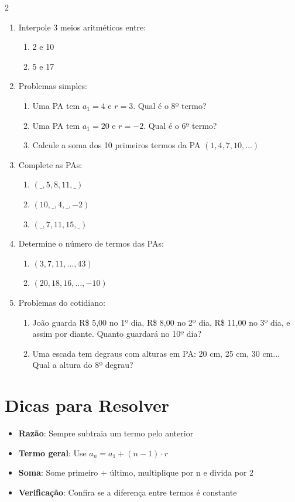 \documentclass[11pt]{article}
\begin{document}
\begin{multicols}{2}
\begin{enumerate}[leftmargin=*]
\item Interpole 3 meios aritméticos entre:
\begin{enumerate}[label=\alph*)]
\item 2 e 10
\item 5 e 17
\end{enumerate}

\item Problemas simples:
\begin{enumerate}[label=\alph*)]
\item Uma PA tem $a_1 = 4$ e $r = 3$. Qual é o 8º termo?
\item Uma PA tem $a_1 = 20$ e $r = -2$. Qual é o 6º termo?
\item Calcule a soma dos 10 primeiros termos da PA $(1, 4, 7, 10, \ldots)$
\end{enumerate}

\item Complete as PAs:
\begin{enumerate}[label=\alph*)]
\item $( \_, 5, 8, 11, \_ )$
\item $(10, \_, 4, \_, -2)$
\item $( \_, 7, 11, 15, \_ )$
\end{enumerate}

\item Determine o número de termos das PAs:
\begin{enumerate}[label=\alph*)]
\item $(3, 7, 11, \ldots, 43)$
\item $(20, 18, 16, \ldots, -10)$
\end{enumerate}

\item Problemas do cotidiano:
\begin{enumerate}[label=\alph*)]
\item João guarda R\$ 5,00 no 1º dia, R\$ 8,00 no 2º dia, R\$ 11,00 no 3º dia, e assim por diante. Quanto guardará no 10º dia?
\item Uma escada tem degraus com alturas em PA: 20 cm, 25 cm, 30 cm... Qual a altura do 8º degrau?
\end{enumerate}

\end{enumerate}

\section*{Dicas para Resolver}

\begin{itemize}
\item \textbf{Razão}: Sempre subtraia um termo pelo anterior
\item \textbf{Termo geral}: Use $a_n = a_1 + (n-1) \cdot r$
\item \textbf{Soma}: Some primeiro + último, multiplique por n e divida por 2
\item \textbf{Verificação}: Confira se a diferença entre termos é constante
\end{itemize}

\end{multicols}
\end{document}
